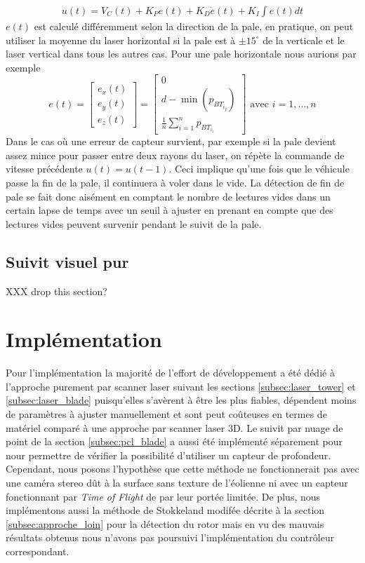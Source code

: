 \begin{align}
  u(t) = V_C(t) + K_P e(t) + K_D\dot{e}(t) + K_I\int{e(t)dt}
  \label{eq:pid_laser_blade}
\end{align}
$e(t)$ est calculé différemment selon la direction de la pale, en pratique, on peut utiliser la moyenne du laser horizontal si la pale est à $\pm15^{\circ}$ de la verticale et le laser vertical dans tous les autres cas. Pour une pale horizontale nous aurions par exemple
\[
e(t) = \begin{bmatrix}e_x(t) \\ e_y(t) \\ e_z(t)\end{bmatrix} =
\begin{bmatrix}
0 \\ d - \min(p_{{BT}_{i_y}}) \\ \frac{1}{n}\sum_{i=1}^{n}p_{{BT}_{i_z}}
\end{bmatrix} \text{ avec } i=1,\ldots,n
\]
Dans le cas où une erreur de capteur survient, par exemple si la pale devient assez mince pour passer entre deux rayons du laser, on répète la commande de vitesse précédente $u(t) = u(t-1)$. Ceci implique qu'une fois que le véhicule passe la fin de la pale, il continuera à voler dans le vide. La détection de fin de pale se fait donc aisément en comptant le nombre de lectures vides dans un certain lapse de temps avec un seuil à ajuster en prenant en compte que des lectures vides peuvent survenir pendant le suivit de la pale.


\subsection{Suivit visuel pur}
\label{subsec:visual_blade}

\color{red}
XXX drop this section?
\color{black}

\section{Implémentation}

Pour l'implémentation la majorité de l'effort de développement a été dédié à l'approche purement par scanner laser suivant les sections \ref{subsec:laser_tower} et \ref{subsec:laser_blade} puisqu'elles s'avèrent à être les plus fiables, dépendent moins de paramètres à ajuster manuellement et sont peut coûteuses en termes de matériel comparé à une approche par scanner laser 3D. Le suivit par nuage de point de la section \ref{subsec:pcl_blade} a aussi été implémenté séparement pour nour permettre de vérifier la possibilité d'utiliser un capteur de profondeur. Cependant, nous posons l'hypothèse que cette méthode ne fonctionnerait pas avec une caméra stereo dût à la surface sans texture de l'éolienne ni avec un capteur fonctionnant par \textit{Time of Flight} de par leur portée limitée.
De plus, nous implémentons aussi la méthode de Stokkeland modifée décrite à la section \ref{subsec:approche_loin} pour la détection du rotor mais en vu des mauvais résultats obtenus nous n'avons pas poursuivi l'implémentation du contrôleur correspondant.

